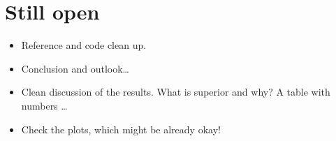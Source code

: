 \documentclass[
reprint,
amsmath,amssymb,amsfonts,clevref,
aps,
prstab,
]{revtex4-2}
\begin{document}
\section{Still open}
	\begin{itemize}
	\item Reference and code clean up.
	\item Conclusion and outlook\dots
	\item Clean discussion of the results. What is superior and why? A table with numbers \dots
	\item Check the plots, which might be already okay!
\end{itemize}
	
\end{document}

